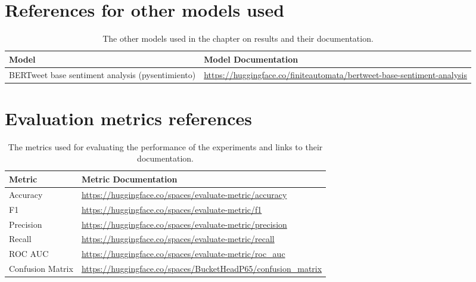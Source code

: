 \section{References for other models used}
\begin{table}[ht]
    \captionsetup{font=small}
    \centering
    \begin{tabularx}{\textwidth}{|l|X|}
        \hline
        \rowcolor[gray]{0.7}
        \textbf{Model}                                   & \textbf{Model Documentation}                                                         \\
        \hline
        BERTweet base sentiment analysis (pysentimiento) & \small{\url{https://huggingface.co/finiteautomata/bertweet-base-sentiment-analysis}} \\
        \hline
    \end{tabularx}
    \caption{The other models used in the chapter on results and their documentation.}
    \label{tab: apdxb_other_model_doc}
\end{table}

\section{Evaluation metrics references}

\begin{table}[ht]
    \captionsetup{font=small}
    \centering
    \begin{tabularx}{\textwidth}{|l|X|}
        \hline
        \rowcolor[gray]{0.7}
        \textbf{Metric}                  & \textbf{Metric Documentation}                                                    \\
        \hline

        Accuracy                         & \small{\url{https://huggingface.co/spaces/evaluate-metric/accuracy}}             \\
        \hline
        F1                               & \small{\url{https://huggingface.co/spaces/evaluate-metric/f1}}                   \\
        \hline
        Precision                        & \small{\url{https://huggingface.co/spaces/evaluate-metric/precision}}            \\
        \hline
        Recall                           & \small{\url{https://huggingface.co/spaces/evaluate-metric/recall}}               \\
        \hline
        ROC AUC                          & \small{\url{https://huggingface.co/spaces/evaluate-metric/roc_auc}}              \\
        \hline
        Confusion Matrix                 & \small{\url{https://huggingface.co/spaces/BucketHeadP65/confusion_matrix}}       \\
        \hline
    \end{tabularx}
    \caption{The metrics used for evaluating the performance of the experiments and links to their documentation.}
    \label{tab: apdxb_metric_doc}
\end{table}

